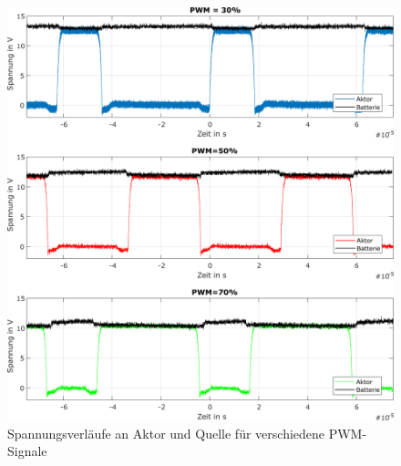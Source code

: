 \begin{figure} [h]
	\centering
	\includegraphics[width=1\linewidth]{Bilder/spannungsverlauefe.pdf}
	\caption{Spannungsverläufe an Aktor und Quelle für verschiedene PWM-Signale}
	\label{fig:spannungsverlaeufe}
\end{figure}

